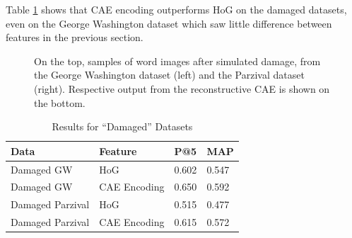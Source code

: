 \documentclass[final]{ukthesis}
\begin{document}
Table \ref{tab:damaged-results} shows that CAE encoding outperforms HoG on the damaged datasets, even on the George Washington dataset which saw little difference between features in the previous section.

\begin{figure}[t]
\begin{center}
\end{center}
\caption{On the top, samples of word images after simulated damage, from the George Washington dataset (left) and the Parzival dataset (right). Respective output from the reconstructive CAE is shown on the bottom.}
\label{fig:damaged-word-samples}
\end{figure}

\begin{table}[h]
\centering
\begin{tabular}{llll}
\textbf{Data}  & \textbf{Feature} & \textbf{P@5} & \textbf{MAP} \\
\hline
Damaged GW    & HoG			& 0.602          & 0.547          \\
Damaged GW    & CAE Encoding 	& 0.650          & 0.592          \\
Damaged Parzival & HoG                     & 0.515          & 0.477          \\
Damaged Parzival & CAE Encoding 	& 0.615          & 0.572          \\   
\end{tabular}
\caption{Results for ``Damaged'' Datasets}
\label{tab:damaged-results}
\end{table}
\end{document}
